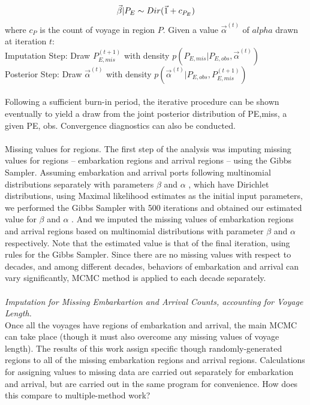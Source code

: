 \documentclass{article}
\begin{document}
\begin{equation}
\vec{\beta}|P_E \sim Dir(\vec{1}+c_{P_E})\\
\end{equation}
where $c_P$ is the count of voyage in region $P$. Given a value $\vec{\alpha}^{(t)}$ of $alpha$ drawn at iteration $t$:\\
Imputation Step: Draw $P^{(t+1)}_{E, mis}$ with density $p(P_{E, mis}|P_{E, obs},\vec{\alpha}^{(t)})$\\
Posterior Step: Draw $\vec{\alpha}^{(t)}$ with density  $p(\vec{\alpha}^{(t)}|P_{E, obs},P^{(t+1)}_{E, mis})$\\
\\
\indent
Following a sufficient burn-in period, the iterative procedure can be shown eventually to yield a draw from the joint posterior distribution of PE,miss, a given PE, obs. Convergence diagnostics can also be conducted.\\
\\
\indent
Missing values for regions. The first step of the analysis was imputing missing values for regions -- embarkation regions and arrival regions -- using the Gibbs Sampler. Assuming embarkation and arrival ports following multinomial distributions separately with parameters $\beta$   and $\alpha$  , which have Dirichlet distributions, using Maximal likelihood estimates as the initial input parameters, we performed the Gibbs Sampler with 500 iterations and obtained our estimated value for $\beta$   and $\alpha$  . And we imputed the missing values of embarkation regions and arrival regions based on multinomial distributions with parameter $\beta$   and $\alpha$   respectively. Note that the estimated value is that of the final iteration, using rules for the Gibbs Sampler.  Since there are no missing values with respect to decades, and among different decades, behaviors of embarkation and arrival can vary significantly, MCMC method is applied to each decade separately.\\
\\
\noindent
\textit{Imputation for Missing Embarkartion and Arrival Counts, accounting for Voyage Length.}\\
\indent
Once all the voyages have regions of embarkation and arrival, the main MCMC can take place (though it must also overcome any missing values of voyage length). The results of this work assign specific though randomly-generated regions to all of the missing embarkation regions and arrival regions. Calculations for assigning values to missing data are carried out separately for embarkation and arrival, but are carried out in the same program for convenience. How does this compare to multiple-method work?\\
\end{document}
